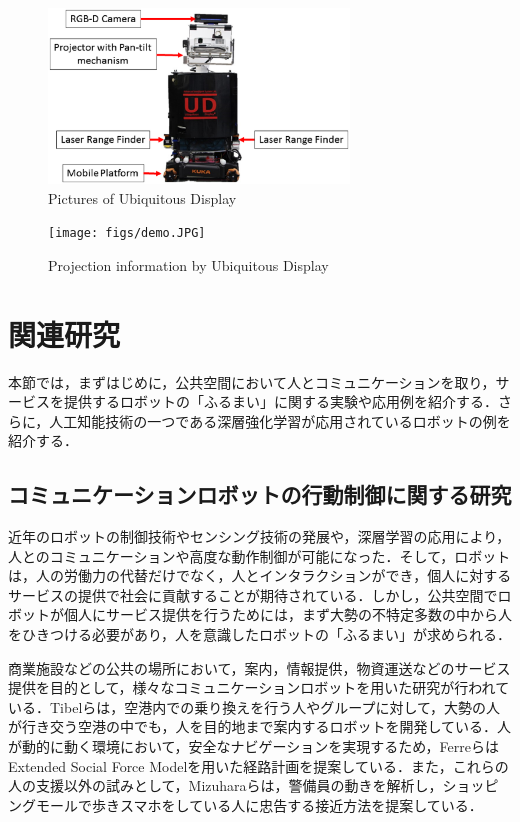 \documentclass[12pt]{sonota/aislab}
\begin{document}
\begin{figure}[t]
\begin{center}
\includegraphics[clip, width=8cm]{figs/ud_with_kinectv2.eps}
\caption{Pictures of Ubiquitous Display}
\label{UD}
\end{center}
\end{figure}

\begin{figure}[t]
\begin{center}
\texttt{[image: figs/demo.JPG]}
\caption{Projection information by Ubiquitous Display}
\label{projection}
\end{center}
\end{figure}

\section{関連研究}
本節では，まずはじめに，公共空間において人とコミュニケーションを取り，サービスを提供するロボットの「ふるまい」に関する実験や応用例を紹介する．さらに，人工知能技術の一つである深層強化学習が応用されているロボットの例を紹介する．

\subsection{コミュニケーションロボットの行動制御に関する研究}
近年のロボットの制御技術やセンシング技術の発展や，深層学習の応用により，人とのコミュニケーションや高度な動作制御が可能になった．そして，ロボットは，人の労働力の代替だけでなく，人とインタラクションができ，個人に対するサービスの提供で社会に貢献することが期待されている．しかし，公共空間でロボットが個人にサービス提供を行うためには，まず大勢の不特定多数の中から人をひきつける必要があり，人を意識したロボットの「ふるまい」が求められる．

商業施設などの公共の場所において，案内，情報提供，物資運送などのサービス提供を目的として，様々なコミュニケーションロボットを用いた研究が行われている．Tibelらは，空港内での乗り換えを行う人やグループに対して，大勢の人が行き交う空港の中でも，人を目的地まで案内するロボットを開発している\cite{spencr}．人が動的に動く環境において，安全なナビゲーションを実現するため，FerreらはExtended Social Force Modelを用いた経路計画を提案している\cite{ESTM}．また，これらの人の支援以外の試みとして，Mizuharaらは，警備員の動きを解析し，ショッピングモールで歩きスマホをしている人に忠告する接近方法を提案している\cite{admonishing}．
\end{document}
